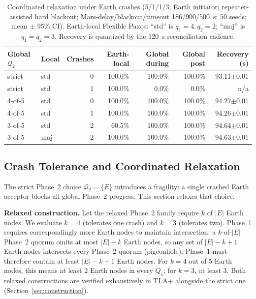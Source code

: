 \documentclass[letterpaper,twocolumn,10pt]{article}
\newcounter{cor}
\begin{document}
\begin{table}[t]
\centering
\footnotesize
\renewcommand{\arraystretch}{0.94}
\setlength{\tabcolsep}{4pt}
\captionsetup{width=0.92\textwidth}
\caption{Coordinated relaxation under Earth crashes (5/1/1/3; Earth initiator; repeater-assisted hard blackout; Mars-delay/blackout/timeout 186/900/500~s; 50 seeds; mean $\pm$ 95\% CI). Earth-local Flexible Paxos: ``std'' is $q_1{=}4,q_2{=}2$; ``maj'' is $q_1{=}q_2{=}3$. Recovery is quantized by the 120~s reconciliation cadence.}
\label{tab:relaxed}
\begin{tabular}{llrrrrr}
\toprule
Global $\mathcal{Q}_2$ & Local & Crashes & Earth-local & Global during & Global post & Recovery (s) \\
\midrule
strict & std & 0 & 100.0\% & 100.0\% & 100.0\% & 93.11$\pm$0.01 \\
strict & std & 1 & 100.0\% & 0.0\% & 0.0\% & n/a \\
4-of-5 & std & 0 & 100.0\% & 100.0\% & 100.0\% & 94.27$\pm$0.01 \\
4-of-5 & std & 1 & 100.0\% & 100.0\% & 100.0\% & 94.26$\pm$0.01 \\
3-of-5 & std & 2 & 60.5\% & 100.0\% & 100.0\% & 94.64$\pm$0.01 \\
3-of-5 & maj & 2 & 100.0\% & 100.0\% & 100.0\% & 94.63$\pm$0.01 \\
\bottomrule
\end{tabular}
\end{table}
\subsection{Crash Tolerance and Coordinated Relaxation}
\label{sec:relaxed}

The strict Phase~2 choice $\mathcal{Q}_2 = \{E\}$ introduces a fragility: a single crashed Earth acceptor blocks all global Phase~2 progress. This section relaxes that choice.

\textbf{Relaxed construction.}
Let the relaxed Phase~2 family require $k$ of $|E|$ Earth nodes. We evaluate $k = 4$ (tolerates one crash) and $k = 3$ (tolerates two). Phase~1 requires correspondingly more Earth nodes to maintain intersection: a $k$-of-$|E|$ Phase~2 quorum omits at most $|E| - k$ Earth nodes, so any set of $|E| - k + 1$ Earth nodes intersects every Phase~2 quorum (pigeonhole). Phase~1 must therefore contain at least $|E| - k + 1$ Earth nodes. For $k = 4$ out of 5 Earth nodes, this means at least 2 Earth nodes in every $Q_1$; for $k = 3$, at least 3. Both relaxed constructions are verified exhaustively in TLA+ alongside the strict one (Section~\ref{sec:construction}).
\end{document}
